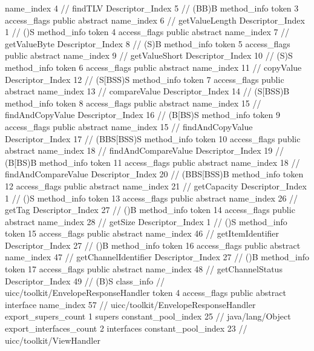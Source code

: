 {{{{{					name_index	4		// findTLV
					Descriptor_Index	5		// (BB)B
				}
				method_info {
					token	3
					access_flags	public abstract
					name_index	6		// getValueLength
					Descriptor_Index	1		// ()S
				}
				method_info {
					token	4
					access_flags	public abstract
					name_index	7		// getValueByte
					Descriptor_Index	8		// (S)B
				}
				method_info {
					token	5
					access_flags	public abstract
					name_index	9		// getValueShort
					Descriptor_Index	10		// (S)S
				}
				method_info {
					token	6
					access_flags	public abstract
					name_index	11		// copyValue
					Descriptor_Index	12		// (S[BSS)S
				}
				method_info {
					token	7
					access_flags	public abstract
					name_index	13		// compareValue
					Descriptor_Index	14		// (S[BSS)B
				}
				method_info {
					token	8
					access_flags	public abstract
					name_index	15		// findAndCopyValue
					Descriptor_Index	16		// (B[BS)S
				}
				method_info {
					token	9
					access_flags	public abstract
					name_index	15		// findAndCopyValue
					Descriptor_Index	17		// (BBS[BSS)S
				}
				method_info {
					token	10
					access_flags	public abstract
					name_index	18		// findAndCompareValue
					Descriptor_Index	19		// (B[BS)B
				}
				method_info {
					token	11
					access_flags	public abstract
					name_index	18		// findAndCompareValue
					Descriptor_Index	20		// (BBS[BSS)B
				}
				method_info {
					token	12
					access_flags	public abstract
					name_index	21		// getCapacity
					Descriptor_Index	1		// ()S
				}
				method_info {
					token	13
					access_flags	public abstract
					name_index	26		// getTag
					Descriptor_Index	27		// ()B
				}
				method_info {
					token	14
					access_flags	public abstract
					name_index	28		// getSize
					Descriptor_Index	1		// ()S
				}
				method_info {
					token	15
					access_flags	public abstract
					name_index	46		// getItemIdentifier
					Descriptor_Index	27		// ()B
				}
				method_info {
					token	16
					access_flags	public abstract
					name_index	47		// getChannelIdentifier
					Descriptor_Index	27		// ()B
				}
				method_info {
					token	17
					access_flags	public abstract
					name_index	48		// getChannelStatus
					Descriptor_Index	49		// (B)S
				}
			}
		}
		class_info {		// uicc/toolkit/EnvelopeResponseHandler
			token	4
			access_flags	public abstract interface
			name_index	57		// uicc/toolkit/EnvelopeResponseHandler
			export_supers_count	1
			supers {
				constant_pool_index	25		// java/lang/Object
			}
			export_interfaces_count	2
			interfaces {
				constant_pool_index	23		// uicc/toolkit/ViewHandler
}}}}

